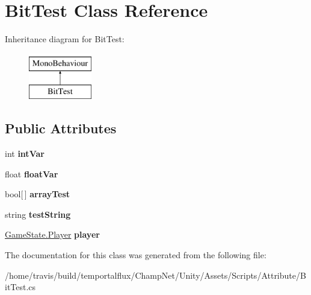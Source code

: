 \hypertarget{class_bit_test}{\section{Bit\-Test Class Reference}
\label{class_bit_test}
}
Inheritance diagram for Bit\-Test\-:\begin{figure}[H]
\begin{center}
\leavevmode
\includegraphics[height=2.000000cm]{class_bit_test}
\end{center}
\end{figure}
\subsection*{Public Attributes}
\begin{DoxyCompactItemize}
\item 
\hypertarget{class_bit_test_a229c089c4bf0f320defa8af85362ca97}{int {\bfseries int\-Var}}\label{class_bit_test_a229c089c4bf0f320defa8af85362ca97}

\item 
\hypertarget{class_bit_test_aff8f50b12ea462699b258dd4fe7da1e7}{float {\bfseries float\-Var}}\label{class_bit_test_aff8f50b12ea462699b258dd4fe7da1e7}

\item 
\hypertarget{class_bit_test_a92242e855e7f4507b804a77ae6221166}{bool\mbox{[}$\,$\mbox{]} {\bfseries array\-Test}}\label{class_bit_test_a92242e855e7f4507b804a77ae6221166}

\item 
\hypertarget{class_bit_test_afca10f624e8a1ad35b1272da122f5884}{string {\bfseries test\-String}}\label{class_bit_test_afca10f624e8a1ad35b1272da122f5884}

\item 
\hypertarget{class_bit_test_ad10d5f7bafa4471c42dff93a411c46bf}{\hyperlink{struct_game_state_1_1_player}{Game\-State.\-Player} {\bfseries player}}\label{class_bit_test_ad10d5f7bafa4471c42dff93a411c46bf}

\end{DoxyCompactItemize}


The documentation for this class was generated from the following file\-:\begin{DoxyCompactItemize}
\item 
/home/travis/build/temportalflux/\-Champ\-Net/\-Unity/\-Assets/\-Scripts/\-Attribute/Bit\-Test.\-cs\end{DoxyCompactItemize}
